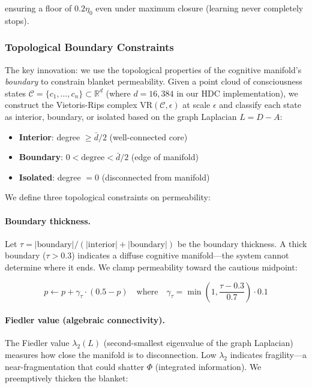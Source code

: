 ensuring a floor of $0.2\eta_0$ even under maximum closure (learning never
completely stops).

\subsubsection{Topological Boundary Constraints}

The key innovation: we use the topological properties of the cognitive manifold's
\emph{boundary} to constrain blanket permeability. Given a point cloud of
consciousness states $\mathcal{C} = \{c_1, \ldots, c_n\} \subset \mathbb{R}^d$
(where $d = 16{,}384$ in our HDC implementation), we construct the Vietoris-Rips
complex $\text{VR}(\mathcal{C}, \epsilon)$ at scale $\epsilon$ and classify each
state as interior, boundary, or isolated based on the graph Laplacian $L = D - A$:

\begin{itemize}
    \item \textbf{Interior}: degree $\geq \bar{d}/2$ (well-connected core)
    \item \textbf{Boundary}: $0 < \text{degree} < \bar{d}/2$ (edge of manifold)
    \item \textbf{Isolated}: degree $= 0$ (disconnected from manifold)
\end{itemize}

We define three topological constraints on permeability:

\paragraph{Boundary thickness.}
Let $\tau = |\text{boundary}| / (|\text{interior}| + |\text{boundary}|)$ be the
boundary thickness. A thick boundary ($\tau > 0.3$) indicates a diffuse cognitive
manifold---the system cannot determine where it ends. We clamp permeability
toward the cautious midpoint:

\begin{equation}
    p \leftarrow p + \gamma_\tau \cdot (0.5 - p) \quad \text{where} \quad
    \gamma_\tau = \min\left(1, \frac{\tau - 0.3}{0.7}\right) \cdot 0.1
    \label{eq:thickness-constraint}
\end{equation}

\paragraph{Fiedler value (algebraic connectivity).}
The Fiedler value $\lambda_2(L)$ (second-smallest eigenvalue of the graph Laplacian)
measures how close the manifold is to disconnection. Low $\lambda_2$ indicates
fragility---a near-fragmentation that could shatter $\Phi$ (integrated information).
We preemptively thicken the blanket:

